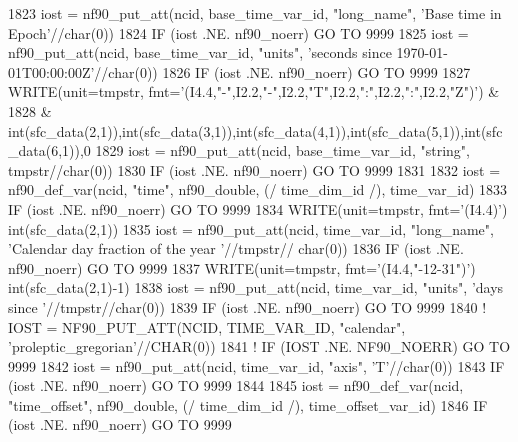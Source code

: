 \begin{DoxyCode}
1823     iost    = nf90\_put\_att(ncid, base\_time\_var\_id, \textcolor{stringliteral}{"long\_name"}, \textcolor{stringliteral}{'Base time in Epoch'}//char(0))
1824     \textcolor{keywordflow}{IF} (iost .NE. nf90\_noerr) \textcolor{keywordflow}{GO TO} 9999
1825     iost    = nf90\_put\_att(ncid, base\_time\_var\_id, \textcolor{stringliteral}{"units"}, \textcolor{stringliteral}{'seconds since 1970-01-01T00:00:00Z'}//char(0))
1826     \textcolor{keywordflow}{IF} (iost .NE. nf90\_noerr) \textcolor{keywordflow}{GO TO} 9999
1827     \textcolor{keyword}{WRITE}(unit=tmpstr, fmt=\textcolor{stringliteral}{'(I4.4,"-",I2.2,"-",I2.2,"T",I2.2,":",I2.2,":",I2.2,"Z")'}) &
1828         & int(sfc\_data(2,1)),int(sfc\_data(3,1)),int(sfc\_data(4,1)),int(sfc\_data(5,1)),int(sfc\_data(6,1)),0
1829     iost    = nf90\_put\_att(ncid, base\_time\_var\_id, \textcolor{stringliteral}{"string"}, tmpstr//char(0))
1830     \textcolor{keywordflow}{IF} (iost .NE. nf90\_noerr) \textcolor{keywordflow}{GO TO} 9999
1831 
1832     iost    = nf90\_def\_var(ncid, \textcolor{stringliteral}{"time"}, nf90\_double, (/ time\_dim\_id /), time\_var\_id)
1833     \textcolor{keywordflow}{IF} (iost .NE. nf90\_noerr) \textcolor{keywordflow}{GO TO} 9999
1834     \textcolor{keyword}{WRITE}(unit=tmpstr, fmt=\textcolor{stringliteral}{'(I4.4)'}) int(sfc\_data(2,1))
1835     iost    = nf90\_put\_att(ncid, time\_var\_id, \textcolor{stringliteral}{"long\_name"}, \textcolor{stringliteral}{'Calendar day fraction of the year '}//tmpstr//
      char(0))
1836     \textcolor{keywordflow}{IF} (iost .NE. nf90\_noerr) \textcolor{keywordflow}{GO TO} 9999
1837     \textcolor{keyword}{WRITE}(unit=tmpstr, fmt=\textcolor{stringliteral}{'(I4.4,"-12-31")'}) int(sfc\_data(2,1)-1)
1838     iost    = nf90\_put\_att(ncid, time\_var\_id, \textcolor{stringliteral}{"units"}, \textcolor{stringliteral}{'days since '}//tmpstr//char(0))
1839     \textcolor{keywordflow}{IF} (iost .NE. nf90\_noerr) \textcolor{keywordflow}{GO TO} 9999
1840 \textcolor{comment}{!    IOST    = NF90\_PUT\_ATT(NCID, TIME\_VAR\_ID, "calendar", 'proleptic\_gregorian'//CHAR(0))}
1841 \textcolor{comment}{!    IF (IOST .NE. NF90\_NOERR) GO TO 9999}
1842     iost    = nf90\_put\_att(ncid, time\_var\_id, \textcolor{stringliteral}{"axis"}, \textcolor{stringliteral}{'T'}//char(0))
1843     \textcolor{keywordflow}{IF} (iost .NE. nf90\_noerr) \textcolor{keywordflow}{GO TO} 9999
1844 
1845     iost    = nf90\_def\_var(ncid, \textcolor{stringliteral}{"time\_offset"}, nf90\_double, (/ time\_dim\_id /), time\_offset\_var\_id)
1846     \textcolor{keywordflow}{IF} (iost .NE. nf90\_noerr) \textcolor{keywordflow}{GO TO} 9999

\end{DoxyCode}
